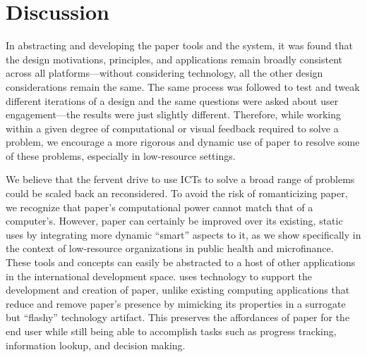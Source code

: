 \documentclass{sig-alternate}
\begin{document}





\section{Discussion}
\label{sec:discussion}

In abstracting and developing the paper tools and the \nifty system, it was found that the design motivations, principles, and applications remain broadly consistent across all platforms---without considering technology, all the other design considerations remain the same. The same process was followed to test and tweak different iterations of a design and the same questions were asked about user engagement---the results were just slightly different. Therefore, while working within a given degree of computational or visual feedback required to solve a problem, we encourage a more rigorous and dynamic use of paper to resolve some of these problems, especially in low-resource settings.

We believe that the fervent drive to use ICTs to solve a broad range of problems could be scaled back an reconsidered. To avoid the risk of romanticizing paper, we recognize that paper's computational power cannot match that of a computer's. However, paper can certainly be improved over its existing, static uses by integrating more dynamic ``smart'' aspects to it, as we show specifically in the context of low-resource organizations in public health and microfinance. These tools and concepts can easily be abstracted to a host of other applications in the international development space. \nifty uses technology to support the development and creation of paper, unlike existing computing applications that reduce and remove paper's presence by mimicking its properties in a surrogate but ``flashy'' technology artifact. This preserves the affordances of paper for the end user while still being able to accomplish tasks such as progress tracking, information lookup, and decision making. 
\end{document}
